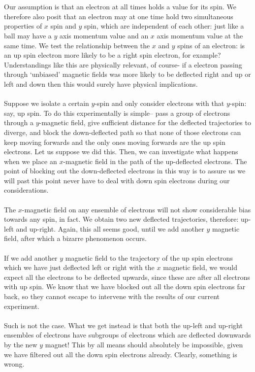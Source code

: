\\\\
Our assumption is that an electron at all times holds a value for its spin. We therefore also posit that an electron may at one time hold two simultaneous properties of $x$ spin and $y$ spin, which are independent of each other: just like a ball may have a $y$ axis momentum value and an $x$ axis momentum value at the same time. We test the relationship between the $x$ and $y$ spins of an electron: is an up spin electron more likely to be a right spin electron, for example? Understandings like this are physically relevant, of course- if a electron passing through `unbiased' magnetic fields was more likely to be deflected right and up or left and down then this would surely have physical implications. 
\\\\
Suppose we isolate a certain $y$-spin and only consider electrons with that $y$-spin: say, up spin. To do this experimentally is simple-- pass a group of electrons through a $y$-magnetic field, give sufficient distance for the deflected trajectories to diverge, and block the down-deflected path so that none of those electrons can keep moving forwards and the only ones moving forwards are the up spin electrons. Let us suppose we did this. Then, we can investigate what happens when we place an $x$-magnetic field in the path of the up-deflected electrons. The point of blocking out the down-deflected electrons in this way is to assure us we will past this point never have to deal with down spin electrons during our considerations.
\\\\
The $x$-magnetic field on any ensemble of electrons will not show considerable bias towards any spin, in fact. We obtain two new deflected trajectories, therefore: up-left and up-right. Again, this all seems good, until we add another $y$ magnetic field, after which a bizarre phenomenon occurs.
\\\\
If we add another $y$ magnetic field to the trajectory of the up spin electrons which we have just deflected left or right with the $x$ magnetic field, we would expect all the electrons to be deflected upwards, since these are after all electrons with up spin. We know that we have blocked out all the down spin electrons far back, so they cannot escape to intervene with the results of our current experiment.
\\\\
Such is not the case. What we get instead is that both the up-left and up-right ensembles of electrons have subgroups of electrons which are deflected downwards by the new $y$ magnet! This by all means should absolutely be impossible, given we have filtered out all the down spin electrons already. Clearly, something is wrong. 
